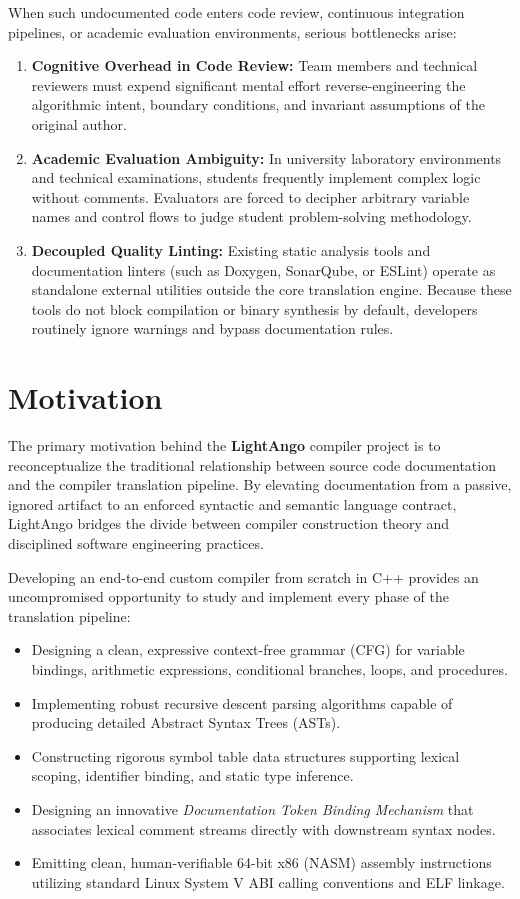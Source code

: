 When such undocumented code enters code review, continuous integration pipelines, or academic evaluation environments, serious bottlenecks arise:
\begin{enumerate}
    \item \textbf{Cognitive Overhead in Code Review:} Team members and technical reviewers must expend significant mental effort reverse-engineering the algorithmic intent, boundary conditions, and invariant assumptions of the original author.
    \item \textbf{Academic Evaluation Ambiguity:} In university laboratory environments and technical examinations, students frequently implement complex logic without comments. Evaluators are forced to decipher arbitrary variable names and control flows to judge student problem-solving methodology.
    \item \textbf{Decoupled Quality Linting:} Existing static analysis tools and documentation linters (such as Doxygen, SonarQube, or ESLint) operate as standalone external utilities outside the core translation engine. Because these tools do not block compilation or binary synthesis by default, developers routinely ignore warnings and bypass documentation rules.
\end{enumerate}

\section{Motivation}
The primary motivation behind the \textbf{LightAngo} compiler project is to reconceptualize the traditional relationship between source code documentation and the compiler translation pipeline. By elevating documentation from a passive, ignored artifact to an enforced syntactic and semantic language contract, LightAngo bridges the divide between compiler construction theory and disciplined software engineering practices.

Developing an end-to-end custom compiler from scratch in C++ provides an uncompromised opportunity to study and implement every phase of the translation pipeline:
\begin{itemize}
    \item Designing a clean, expressive context-free grammar (CFG) for variable bindings, arithmetic expressions, conditional branches, loops, and procedures.
    \item Implementing robust recursive descent parsing algorithms capable of producing detailed Abstract Syntax Trees (ASTs).
    \item Constructing rigorous symbol table data structures supporting lexical scoping, identifier binding, and static type inference.
    \item Designing an innovative \textit{Documentation Token Binding Mechanism} that associates lexical comment streams directly with downstream syntax nodes.
    \item Emitting clean, human-verifiable 64-bit x86 (NASM) assembly instructions utilizing standard Linux System V ABI calling conventions and ELF linkage.
\end{itemize}

